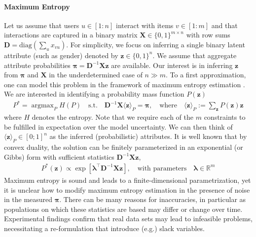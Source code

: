 \documentclass{article} %
\DeclareMathOperator*{\argmax}{\arg\max}
\newcommand{\z}{{\mathbf z}}
\newcommand{\X}{{\mathbf X}}
\newcommand{\D}{{\mathbf D}}
\newcommand{\vlambda}{{\pmb \lambda}}
\newcommand{\vpi}{{\pmb \pi}}
\renewcommand{\Re}{{\mathbb R}}
\begin{document}
\paragraph*{Maximum Entropy} 
Let us assume that users $u \in [1:n]$ interact with items $v \in [1:m]$ and that interactions are captured in a binary matrix $\X  \in \{0,1\}^{m \times n}$ with row sums $\D = \text{diag}(\sum_{u} x_{vu})$. For simplicity, we focus on inferring a single binary latent attribute (such as gender) denoted by $\z \in \{0,1\}^n$. 
We assume that aggregate attribute probabilities $\vpi = \D^{-1} \X \z$  are available. Our interest is in inferring $\z$ from $\vpi$ and $\X$ in the underdetermined case of $n \gg m$. To a first approximation, one can model this problem in the framework of maximum entropy estimation \cite{shore1980axiomatic} \cite{jaynes1982rationale}. We are interested in identifying a probability mass function $P(\z)$
\begin{align}
P^* = \argmax_P H(P) \quad \text{s.t.} \quad  \D ^{-1} \X \langle \z\rangle_P = \vpi, \quad \text{where} \quad \langle \z \rangle_P := \sum_{\z} P(\z) \z
\end{align}
where $H$ denotes the entropy. Note that we require each of the $m$ constraints to be fulfilled in expectation over the model uncertainty. We can then think of $\langle \z\rangle_P \in [0;1]^n$ as the inferred (probabilistic) attributes. It is well known that by convex duality, the solution can be finitely parameterized in an exponential (or Gibbs) form with sufficient statistics $\D^{-1}\X\z$,
\begin{align}
P^*(\z)  \propto \exp \left[  \vlambda^\top \D^{-1}\X \z\right],\quad \text{with parameters} \quad \vlambda \in \Re^m 
\end{align}
Maximum entropy is  sound and leads to a finite-dimensional  parametrization, yet it is unclear how to modify maximum entropy estimation in the presence of noise in the measured $\vpi$. There can be many reasons for inaccuracies, in particular as populations on which these statistics are based may differ or change over time. Experimental findings confirm that real data sets may lead to infeasible problems, necessitating a re-formulation that introduce (e.g.) slack variables. 
\end{document}
